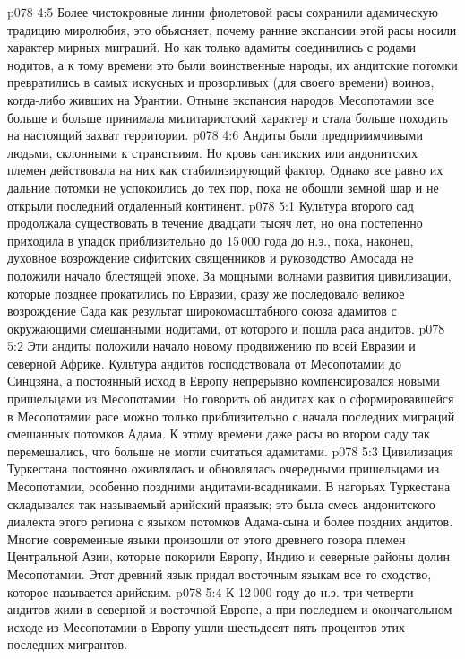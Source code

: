\vs p078 4:5 \pc Более чистокровные линии фиолетовой расы сохранили адамическую традицию миролюбия, это объясняет, почему ранние экспансии этой расы носили характер мирных миграций. Но как только адамиты соединились с родами нодитов, а к тому времени это были воинственные народы, их андитские потомки превратились в самых искусных и прозорливых (для своего времени) воинов, когда\hyp{}либо живших на Урантии. Отныне экспансия народов Месопотамии все больше и больше принимала милитаристский характер и стала больше походить на настоящий захват территории.
\vs p078 4:6 Андиты были предприимчивыми людьми, склонными к странствиям. Но кровь сангикских или андонитских племен действовала на них как стабилизирующий фактор. Однако все равно их дальние потомки не успокоились до тех пор, пока не обошли земной шар и не открыли последний отдаленный континент.
\vs p078 5:1 Культура второго сад продолжала существовать в течение двадцати тысяч лет, но она постепенно приходила в упадок приблизительно до 15\,000 года до н.э., пока, наконец, духовное возрождение сифитских священников и руководство Амосада не положили начало блестящей эпохе. За мощными волнами развития цивилизации, которые позднее прокатились по Евразии, сразу же последовало великое возрождение Сада как результат широкомасштабного союза адамитов с окружающими смешанными нодитами, от которого и пошла раса андитов.
\vs p078 5:2 Эти андиты положили начало новому продвижению по всей Евразии и северной Африке. Культура андитов господствовала от Месопотамии до Синцзяна, а постоянный исход в Европу непрерывно компенсировался новыми пришельцами из Месопотамии. Но говорить об андитах как о сформировавшейся в Месопотамии расе можно только приблизительно с начала последних миграций смешанных потомков Адама. К этому времени даже расы во втором саду так перемешались, что больше не могли считаться адамитами.
\vs p078 5:3 Цивилизация Туркестана постоянно оживлялась и обновлялась очередными пришельцами из Месопотамии, особенно поздними андитами\hyp{}всадниками. В нагорьях Туркестана складывался так называемый арийский праязык; это была смесь андонитского диалекта этого региона с языком потомков Адама\hyp{}сына и более поздних андитов. Многие современные языки произошли от этого древнего говора племен Центральной Азии, которые покорили Европу, Индию и северные районы долин Месопотамии. Этот древний язык придал восточным языкам все то сходство, которое называется арийским.
\vs p078 5:4 \pc К 12\,000 году до н.э. три четверти андитов жили в северной и восточной Европе, а при последнем и окончательном исходе из Месопотамии в Европу ушли шестьдесят пять процентов этих последних мигрантов.
